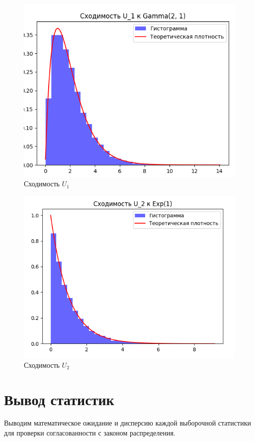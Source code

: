 \documentclass[14pt]{extreport}
\begin{document}
\begin{figure}[H]
    \centering
    \includegraphics[width=0.9\linewidth]{4.png}
    \caption{Сходимость \(U_1\)}
\end{figure}

\begin{figure}[H]
    \centering
    \includegraphics[width=0.9\linewidth]{5.png}
    \caption{Сходимость \(U_2\)}
\end{figure}

\section{Вывод статистик}

Выводим математическое ожидание и дисперсию каждой выборочной статистики для проверки согласованности с законом распределения.
\end{document}
